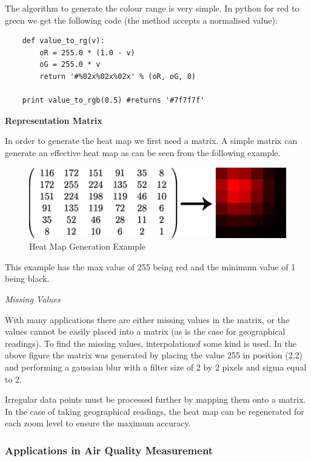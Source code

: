 The algorithm to generate the colour range is very simple. In python for red to green we get the following code (the method accepts a normalised value):

\begin{verbatim}	
	def value_to_rg(v):
	    oR = 255.0 * (1.0 - v)
	    oG = 255.0 * v
	    return '#%02x%02x%02x' % (oR, oG, 0)
	    
	print value_to_rgb(0.5) #returns '#7f7f7f'
\end{verbatim}


\textbf{Representation Matrix}

In order to generate the heat map we first need a matrix. A simple matrix can generate an effective heat map as can be seen from the following example.

\begin{figure}[H]
        \begin{center}
                \includegraphics[scale=0.5]{./images/heatmaps/HeatMapGaussianExample.png}
                \caption{Heat Map Generation Example}
        \end{center}
\end{figure}

This example has the max value of 255 being red and the minimum value of 1 being black. 

\emph{Missing Values}

With many applications there are either missing values in the matrix, or the values cannot be easily placed into a matrix (as is the case for geographical readings). To find the missing values, interpolationof some kind is used. In the above figure the matrix was generated by placing the value 255 in position (2,2) and performing a gaussian blur with a filter size of 2 by 2 pixels and sigma equal to 2. 

Irregular data points must be processed further by mapping them onto a matrix. In the case of taking geographical readings, the heat map can be regenerated for each zoom level to ensure the maximum accuracy. 

\subsubsection{Applications in Air Quality Measurement}\label{applicationsinaqmeasurement}

